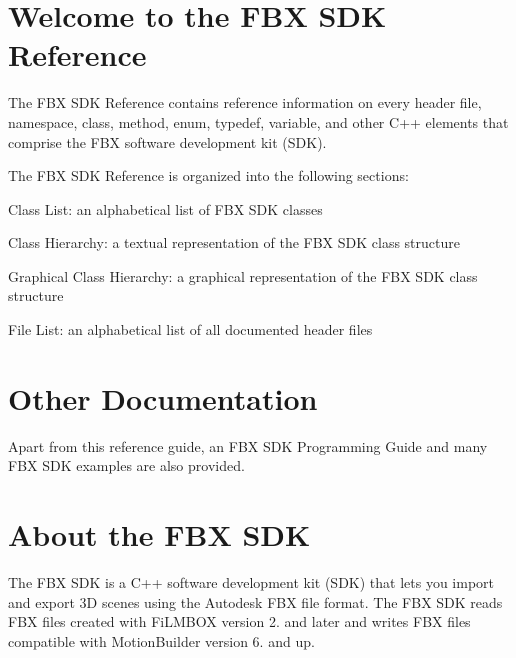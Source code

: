 \hypertarget{index_welcome}{}\section{Welcome to the F\+B\+X S\+D\+K Reference}\label{index_welcome}
The F\+BX S\+DK Reference contains reference information on every header file, namespace, class, method, enum, typedef, variable, and other C++ elements that comprise the F\+BX software development kit (S\+DK). 

The F\+BX S\+DK Reference is organized into the following sections\+: 
\begin{DoxyItemize}
\item Class List\+: an alphabetical list of F\+BX S\+DK classes 
\item Class Hierarchy\+: a textual representation of the F\+BX S\+DK class structure 
\item Graphical Class Hierarchy\+: a graphical representation of the F\+BX S\+DK class structure 
\item File List\+: an alphabetical list of all documented header files
\end{DoxyItemize}\hypertarget{index_otherdocumentation}{}\section{Other Documentation}\label{index_otherdocumentation}
Apart from this reference guide, an F\+BX S\+DK Programming Guide and many F\+BX S\+DK examples are also provided. \hypertarget{index_aboutFBXSDK}{}\section{About the F\+B\+X S\+DK}\label{index_aboutFBXSDK}
The F\+BX S\+DK is a C++ software development kit (S\+DK) that lets you import and export 3D scenes using the Autodesk F\+BX file format. The F\+BX S\+DK reads F\+BX files created with Fi\+L\+M\+B\+OX version 2. and later and writes F\+BX files compatible with Motion\+Builder version 6. and up. 